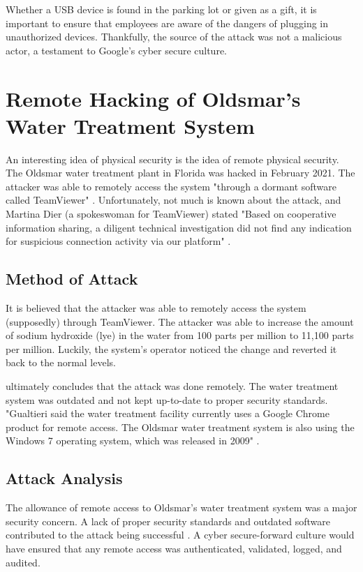 \documentclass[acmsmall]{acmart}
\begin{document}
Whether a USB device is found in the parking lot or given as a gift, it is important
to ensure that employees are aware of the dangers of plugging in unauthorized devices.
Thankfully, the source of the attack was not a malicious actor, a testament to
Google's cyber secure culture.

\section{Remote Hacking of Oldsmar's Water Treatment System}
An interesting idea of physical security is the idea of remote physical security.
The Oldsmar water treatment plant in Florida was hacked in February 2021. The
attacker was able to remotely access the system
"through a dormant software called TeamViewer" \cite{CCNFlorida}.
Unfortunately, not much is known about the attack, and Martina Dier (a spokeswoman
for TeamViewer) stated "Based on cooperative information sharing, a diligent technical
investigation did not find any indication for suspicious connection activity via our
platform" \cite{CCNFlorida}.

\subsection{Method of Attack}
It is believed that the attacker was able to remotely access the system (supposedly)
through TeamViewer. The attacker was able to increase the amount of sodium hydroxide (lye)
in the water from 100 parts per million to 11,100 parts per million. Luckily,
the system's operator noticed the change and reverted it back to the normal levels.

\cite{CCNFlorida} ultimately concludes that the attack was done remotely. The
water treatment system was outdated and not kept up-to-date to proper security
standards. "Gualtieri said the water treatment facility currently uses a Google
Chrome product for remote access. The Oldsmar water treatment system is also using
the Windows 7 operating system, which was released in 2009" \cite{CCNFlorida}.

\subsection{Attack Analysis}
The allowance of remote access to Oldsmar's water treatment system was a major
security concern. A lack of proper security standards and outdated software
contributed to the attack being successful \cite{CCNFlorida}. A cyber secure-forward
culture would have ensured that any remote access was authenticated, validated,
logged, and audited.
\end{document}
